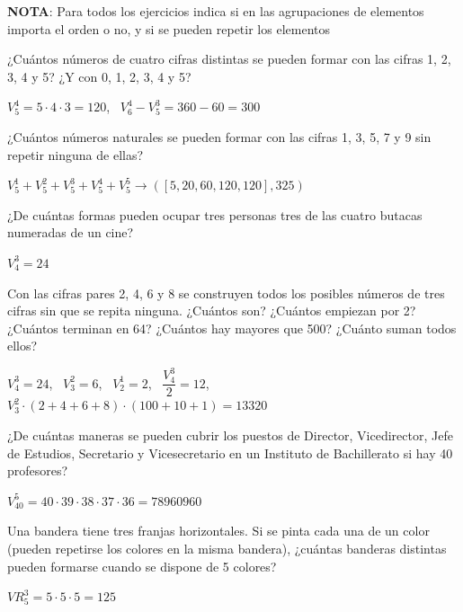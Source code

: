 \documentclass[spanish, 10pt]{exam}
\begin{document}
\textbf{NOTA}: Para todos los ejercicios indica si en las agrupaciones de elementos importa el orden o no, y si se pueden repetir los elementos 
\begin{questions}
\question ¿Cuántos números de cuatro cifras distintas se pueden formar con las cifras 1, 2, 3, 4 y 5? ¿Y con 0, 1, 2, 3, 4 y 5?

\begin{solution}
$V_5^{4}=5\cdot 4\cdot 3 = 120$, \
$V_6^4 - V_5^3 = 360 - 60 = 300$
\end{solution}

\question ¿Cuántos números naturales se pueden formar con las cifras 1, 3, 5, 7 y 9 sin repetir ninguna de ellas?
\begin{solution}
$V_5^1+V_5^2+V_5^3+V_5^4+V_5^5 \to ([5, 20, 60, 120, 120], 325)$
\end{solution}


\question ¿De cuántas formas pueden ocupar tres personas tres de las cuatro butacas numeradas de un cine?

\begin{solution}
$ V_4^3=24$
\end{solution}


\question Con las cifras pares 2, 4, 6 y 8 se construyen todos los posibles números de tres cifras sin que se repita ninguna. ¿Cuántos son? ¿Cuántos empiezan por 2? ¿Cuántos terminan en 64? ¿Cuántos hay mayores que 500? ¿Cuánto suman todos ellos?
\begin{solution}
$V_4^3=24 $, \ 
$V_3^2=6 $,  \ 
$V_2^1=2 $, \ 
$\dfrac{V_4^3}{2}=12 $, \
$V_3^2 \cdot (2 + 4 + 6 + 8) \cdot (100 + 10 +1) =13320$
\end{solution}

\question ¿De cuántas maneras se pueden cubrir los puestos de Director, Vicedirector, Jefe de Estudios, Secretario y Vicesecretario en un Instituto de Bachillerato si hay 40 profesores?

\begin{solution}
$V_{40}^5=40\cdot39\cdot38\cdot37\cdot36=78960960$
\end{solution}

\question Una bandera tiene tres franjas horizontales. Si se pinta cada una de un color (pueden repetirse los colores en la misma bandera), ¿cuántas banderas distintas pueden formarse cuando se dispone de 5 colores?
\begin{solution}
$ {VR}_5^3=5\cdot5\cdot5=125$
\end{solution}


\end{questions}
\end{document}
